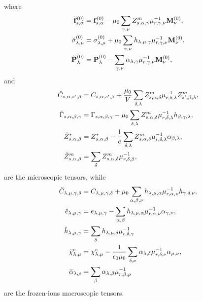 \documentclass[12pt,a4paper]{article}
\begin{document}
where
\begin{align}
\breve {\bf f}^{(0)}_{s,\alpha}&= {\bf f}^{(0)}_{s,\alpha} - \mu_0 
\sum_{\gamma,\nu}
Z^m_{s,\alpha,\gamma} \mu^{-1}_{r,\gamma,\nu} {\bf M}^{(0)}_\nu, \\
\breve \sigma^{(0)}_{\lambda,\mu}&= \sigma^{(0)}_{\lambda,\mu}
+\mu_0 \sum_{\gamma,\nu} h_{\lambda,\mu,\gamma} \mu^{-1}_{r,\gamma,\nu} 
{\bf M}^{(0)}_\nu, \\
\breve {\bf P}^{(0)}_\lambda&= {\bf P}^{(0)}_\lambda -
\sum_{\gamma,\nu} \alpha_{\lambda,\gamma} \mu^{-1}_{r,\gamma,\nu} 
{\bf M}^{(0)}_\nu, \\
\end{align}
and
\begin{align}
\breve C_{s,\alpha,s',\beta} &= C_{s,\alpha,s',\beta}+
{\mu_0\over V}  \sum_{\delta,\lambda} Z^m_{s,\alpha,\delta}
\mu^{-1}_{r,\delta,\lambda}Z^m_{s',\beta,\lambda},\\
\breve \Gamma_{s,\alpha,\beta,\gamma} &= \Gamma_{s,\alpha,\beta,\gamma}
- \mu_0 \sum_{\delta,\lambda} Z^m_{s,\alpha,\delta}
\mu^{-1}_{r,\delta,\lambda} h_{\beta,\gamma,\lambda}, \\
\breve Z^*_{s,\alpha,\beta} &= Z^*_{s,\alpha,\beta}
-{1\over e} \sum_{\delta,\lambda} Z^m_{s,\alpha,\delta} 
\mu^{-1}_{r,\delta,\lambda} \alpha_{\beta,\lambda}, \\
\breve Z^m_{s,\alpha,\beta} &= \sum_{\delta} Z^m_{s,\alpha,\delta} 
\mu^{-1}_{r,\delta,\beta}, 
\end{align}
are the microscopic tensors, while
\begin{align}
\breve C_{\lambda,\mu,\gamma,\delta} &=
C_{\lambda,\mu,\gamma,\delta} + \mu_0 \sum_{\alpha,\beta,\nu}
h_{\lambda,\mu,\alpha} \mu^{-1}_{r,\alpha,\nu} 
h_{\gamma,\delta,\nu}, \\
\breve e_{\lambda,\mu,\gamma}&= e_{\lambda,\mu,\gamma}
-\sum_{\alpha,\beta} h_{\lambda,\mu,\alpha} \mu^{-1}_{r,\alpha,\nu}
\alpha_{\gamma,\nu}, \\
\breve h_{\lambda,\mu,\gamma}&= \sum_\delta h_{\lambda,\mu,\delta}
\mu^{-1}_{r,\delta,\gamma} \\
\breve \chi^e_{\lambda,\mu}&= \chi^e_{\lambda,\mu}
-{1\over \epsilon_0 \mu_0} \sum_{\delta,\nu} \alpha_{\lambda,\delta} 
\mu^{-1}_{r,\delta,\nu} \alpha_{\mu,\nu}, \\
\breve \alpha_{\lambda,\rho} &= \sum_\beta \alpha_{\lambda,\beta}
\mu^{-1}_{r,\beta,\rho}
\end{align}
are the frozen-ions macroscopic tensors.
\\
\newpage
\end{document}
